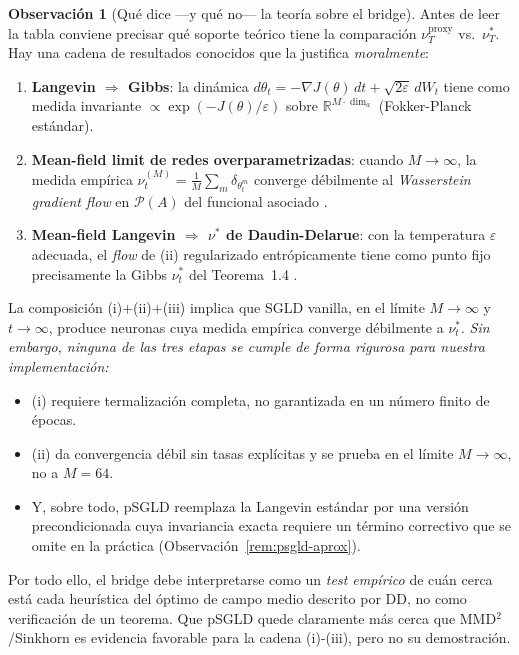 \documentclass[11pt, a4paper]{article}
\theoremstyle{definition}
\newtheorem{remark}{Observación}[section]
\newcommand{\R}{\mathbb{R}}
\newcommand{\eps}{\varepsilon}
\begin{document}
\begin{remark}[Qué dice ---y qué no--- la teoría sobre el bridge]
\label{rem:cadena-mfl}
Antes de leer la tabla conviene precisar qué soporte teórico tiene la
comparación $\nu^{\text{proxy}}_T$ vs.\ $\nu^*_T$. Hay una cadena de
resultados conocidos que la justifica \emph{moralmente}:
\begin{enumerate}
  \item[(i)] \textbf{Langevin $\Rightarrow$ Gibbs}: la dinámica
        $d\theta_t = -\nabla J(\theta)\,dt + \sqrt{2\eps}\,dW_t$
        tiene como medida invariante $\propto\exp(-J(\theta)/\eps)$
        sobre $\R^{M\cdot \dim_a}$ (Fokker-Planck estándar).
  \item[(ii)] \textbf{Mean-field limit de redes
        overparametrizadas}: cuando $M\to\infty$, la medida empírica
        $\nu^{(M)}_t = \tfrac1M\sum_m\delta_{\theta_t^m}$ converge
        débilmente al \emph{Wasserstein gradient flow} en
        $\mathcal{P}(A)$ del funcional asociado
        \cite{MeiMontanariNguyen2018,ChizatBach2018,SirignanoSpiliopoulos2020}.
  \item[(iii)] \textbf{Mean-field Langevin $\Rightarrow$ $\nu^*$ de
        Daudin-Delarue}: con la temperatura $\eps$ adecuada, el
        \emph{flow} de (ii) regularizado entrópicamente tiene como
        punto fijo precisamente la Gibbs $\nu^*_t$ del Teorema~1.4
        \cite{HuRenSiskaSzpruch2021,Nitanda2017,ChenChewi2022}.
\end{enumerate}
La composición (i)+(ii)+(iii) implica que SGLD vanilla, en el límite
$M\to\infty$ y $t\to\infty$, produce neuronas cuya medida empírica
converge débilmente a $\nu^*_t$. \emph{Sin embargo, ninguna de las
tres etapas se cumple de forma rigurosa para nuestra implementación:}
\begin{itemize}
  \item (i) requiere termalización completa, no garantizada en un
        número finito de épocas.
  \item (ii) da convergencia débil sin tasas explícitas y se prueba
        en el límite $M\to\infty$, no a $M=64$.
  \item Y, sobre todo, pSGLD reemplaza la Langevin estándar por una
        versión precondicionada cuya invariancia exacta requiere un
        término correctivo que se omite en la práctica
        (Observación~\ref{rem:psgld-aprox}).
\end{itemize}
Por todo ello, el bridge debe interpretarse como un \emph{test
empírico} de cuán cerca está cada heurística del óptimo de campo
medio descrito por DD, no como verificación de un teorema. Que pSGLD
quede claramente más cerca que MMD$^2$/Sinkhorn es evidencia
favorable para la cadena (i)-(iii), pero no su demostración.
\end{remark}
\end{document}
